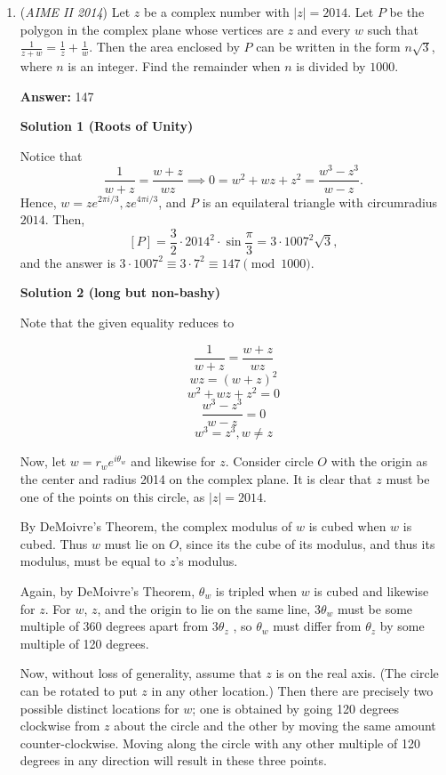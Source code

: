 \begin{enumerate}
	\item (\textit{AIME II 2014}) Let $z$ be a complex number with $|z|=2014$. Let $P$ be the polygon in the complex plane whose vertices are $z$ and every $w$ such that $\frac{1}{z+w}=\frac{1}{z}+\frac{1}{w}$. Then the area enclosed by $P$ can be written in the form $n\sqrt{3}$, where $n$ is an integer. Find the remainder when $n$ is divided by $1000$. 


 
 \textbf{Answer: }147



\textbf{Solution 1 (Roots of Unity)}

Notice that 
 \[\frac1{w+z} = \frac{w+z}{wz} \implies 0 = w^2 + wz + z^2 = \frac{w^3-z^3}{w-z}.\]Hence, $w=ze^{2\pi i/3},ze^{4\pi i/3}$, and $P$ is an equilateral triangle with circumradius $2014$. Then, 
 \[[P]=\frac{3}{2}\cdot 2014^2\cdot\sin\frac{\pi}3=3\cdot 1007^2\sqrt3,\]and the answer is $3\cdot 1007^2\equiv 3\cdot 7^2\equiv\boxed{147}\pmod{1000}$.

 



\textbf{Solution 2 (long but non-bashy)}

Note that the given equality reduces to

 
 \[\frac{1}{w+z} = \frac{w+z}{wz}\]
 \[wz = {(w+z)}^2\]
 \[w^2 + wz + z^2 = 0\]
 \[\frac{w^3 - z^3}{w-z} = 0\]
 \[w^3 = z^3, w \neq z\]

 Now, let $w = r_w e^{i \theta_w}$ and likewise for $z$. Consider circle $O$ with the origin as the center and radius 2014 on the complex plane. It is clear that $z$ must be one of the points on this circle, as $|z| = 2014$. 

 By DeMoivre's Theorem, the complex modulus of $w$ is cubed when $w$ is cubed. Thus $w$ must lie on $O$, since its the cube of its modulus, and thus its modulus, must be equal to $z$'s modulus.

 Again, by DeMoivre's Theorem, $\theta_w$ is tripled when $w$ is cubed and likewise for $z$. For $w$, $z$, and the origin to lie on the same line, $3 \theta_w$ must be some multiple of 360 degrees apart from $3 \theta_z$ , so $\theta_w$ must differ from $\theta_z$ by some multiple of 120 degrees.

 Now, without loss of generality, assume that $z$ is on the real axis. (The circle can be rotated to put $z$ in any other location.) Then there are precisely two possible distinct locations for $w$; one is obtained by going 120 degrees clockwise from $z$ about the circle and the other by moving the same amount counter-clockwise. Moving along the circle with any other multiple of 120 degrees in any direction will result in these three points.


\end{enumerate}
